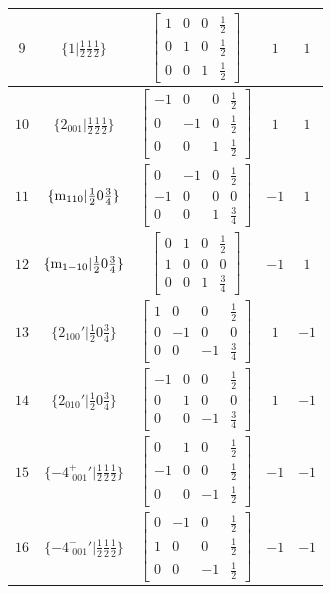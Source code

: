\documentclass[fleqn,8pt]{jsarticle}
\begin{document}
\begin{longtable}{ccccc}
$ 9 $ & $ \{1|\frac{1}{2} \frac{1}{2} \frac{1}{2}\} $ & $ \begin{bmatrix} 1 & 0 & 0 & \frac{1}{2} \\ 0 & 1 & 0 & \frac{1}{2} \\ 0 & 0 & 1 & \frac{1}{2} \end{bmatrix} $ & $ 1 $ & $ 1 $ \\ \hline
$ 10 $ & $ \{2{}_{001}|\frac{1}{2} \frac{1}{2} \frac{1}{2}\} $ & $ \begin{bmatrix} -1 & 0 & 0 & \frac{1}{2} \\ 0 & -1 & 0 & \frac{1}{2} \\ 0 & 0 & 1 & \frac{1}{2} \end{bmatrix} $ & $ 1 $ & $ 1 $ \\ \hline
$ 11 $ & $ \{{\rm m}_{110}|\frac{1}{2} 0 \frac{3}{4}\} $ & $ \begin{bmatrix} 0 & -1 & 0 & \frac{1}{2} \\ -1 & 0 & 0 & 0 \\ 0 & 0 & 1 & \frac{3}{4} \end{bmatrix} $ & $ -1 $ & $ 1 $ \\ \hline
$ 12 $ & $ \{{\rm m}_{1-10}|\frac{1}{2} 0 \frac{3}{4}\} $ & $ \begin{bmatrix} 0 & 1 & 0 & \frac{1}{2} \\ 1 & 0 & 0 & 0 \\ 0 & 0 & 1 & \frac{3}{4} \end{bmatrix} $ & $ -1 $ & $ 1 $ \\ \hline
$ 13 $ & $ \{2{}_{100}{}'|\frac{1}{2} 0 \frac{3}{4}\} $ & $ \begin{bmatrix} 1 & 0 & 0 & \frac{1}{2} \\ 0 & -1 & 0 & 0 \\ 0 & 0 & -1 & \frac{3}{4} \end{bmatrix} $ & $ 1 $ & $ -1 $ \\ \hline
$ 14 $ & $ \{2{}_{010}{}'|\frac{1}{2} 0 \frac{3}{4}\} $ & $ \begin{bmatrix} -1 & 0 & 0 & \frac{1}{2} \\ 0 & 1 & 0 & 0 \\ 0 & 0 & -1 & \frac{3}{4} \end{bmatrix} $ & $ 1 $ & $ -1 $ \\ \hline
$ 15 $ & $ \{-4^{+}_{\,\,001}{}'|\frac{1}{2} \frac{1}{2} \frac{1}{2}\} $ & $ \begin{bmatrix} 0 & 1 & 0 & \frac{1}{2} \\ -1 & 0 & 0 & \frac{1}{2} \\ 0 & 0 & -1 & \frac{1}{2} \end{bmatrix} $ & $ -1 $ & $ -1 $ \\ \hline
$ 16 $ & $ \{-4^{-}_{\,\,001}{}'|\frac{1}{2} \frac{1}{2} \frac{1}{2}\} $ & $ \begin{bmatrix} 0 & -1 & 0 & \frac{1}{2} \\ 1 & 0 & 0 & \frac{1}{2} \\ 0 & 0 & -1 & \frac{1}{2} \end{bmatrix} $ & $ -1 $ & $ -1 $ \\
\end{longtable}
\end{document}
